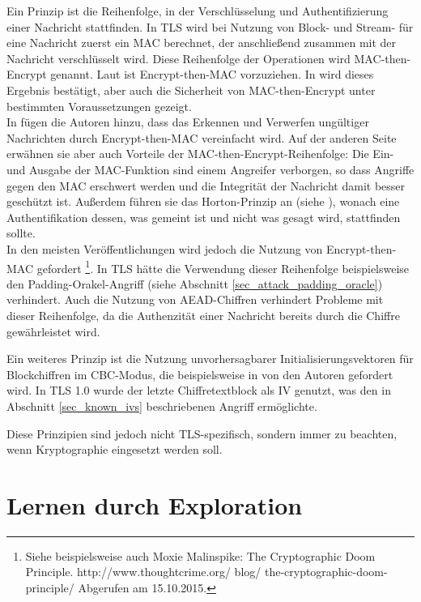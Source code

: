 Ein Prinzip ist die Reihenfolge, in der Verschlüsselung und Authentifizierung einer Nachricht stattfinden. 
In TLS wird bei Nutzung von Block- und Stream-\ciphersuites{} für eine Nachricht zuerst ein MAC berechnet, der anschließend zusammen mit der Nachricht verschlüsselt wird. Diese Reihenfolge der Operationen wird MAC-then-Encrypt genannt. Laut \cite{AE2000} ist Encrypt-then-MAC vorzuziehen. In \cite{krawczyk01} wird dieses Ergebnis bestätigt, aber auch die Sicherheit von MAC-then-Encrypt unter bestimmten Voraussetzungen gezeigt.\\
In \cite{ferguson10} fügen die Autoren hinzu, dass das Erkennen und Verwerfen ungültiger Nachrichten durch Encrypt-then-MAC vereinfacht wird. Auf der anderen Seite erwähnen sie aber auch Vorteile der MAC-then-Encrypt-Reihenfolge: Die Ein- und Ausgabe der MAC-Funktion sind einem Angreifer verborgen, so dass Angriffe gegen den MAC erschwert werden und die Integrität der Nachricht damit besser geschützt ist. Außerdem führen sie das Horton-Prinzip an (siehe \cite{wagner96}), wonach eine Authentifikation dessen, was gemeint ist und nicht was gesagt wird, stattfinden sollte.\\ %
In den meisten Veröffentlichungen wird jedoch die Nutzung von Encrypt-then-MAC gefordert \footnote{
	Siehe beispielsweise auch Moxie Malinspike: The Cryptographic Doom Principle. http://www.thoughtcrime.org/ blog/ the-cryptographic-doom-principle/ Abgerufen am 15.10.2015.
}. In TLS hätte die Verwendung dieser Reihenfolge beispielsweise den Padding-Orakel-Angriff (siehe Abschnitt \ref{sec_attack_padding_oracle}) verhindert. Auch die Nutzung von AEAD-Chiffren verhindert Probleme mit dieser Reihenfolge, da die Authenzität einer Nachricht bereits durch die Chiffre gewährleistet wird.

Ein weiteres Prinzip ist die Nutzung unvorhersagbarer Initialisierungsvektoren für Blockchiffren im CBC-Modus, die beispielsweise in \cite{ferguson10} von den Autoren gefordert wird. In TLS 1.0 wurde der letzte Chiffretextblock als IV genutzt, was den in Abschnitt \ref{sec_known_ivs} beschriebenen Angriff ermöglichte.

Diese Prinzipien sind jedoch nicht TLS-spezifisch, sondern immer zu beachten, wenn Kryptographie eingesetzt werden soll.

\section{Lernen durch Exploration}
\label{sec_exploration}

